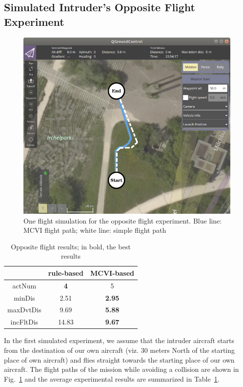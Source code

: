 \documentclass{article}
\begin{document}
\subsection{Simulated Intruder's Opposite Flight Experiment}
\label{ssec:oppositeFlight}

\begin{figure}[t]
    \centering
	\includegraphics[width=0.95\linewidth]{oppositeFlightSimulation.jpg} 
	\caption{One flight simulation for the opposite flight experiment. Blue line: MCVI flight path; white line: simple flight path}
	\label{fig:oppositeFlightSimulation}
\end{figure}

\begin{table}[t]
	\caption{Opposite flight results; in bold, the best results}
	\label{tab:oppositeFlightResults}
	\centering
	\begin{tabular}{c|c|c}
		& rule-based & MCVI-based\\
		\hline 
		actNum & \textbf{4} & 5\\
		minDis & 2.51 & \textbf{2.95} \\
		maxDvtDis & 9.69 & \textbf{5.88} \\
		incFltDis & 14.83 & \textbf{9.67}\\
	\end{tabular}
\end{table}

In the first simulated experiment, we assume that the intruder aircraft starts from the destination of our own aircraft (viz. 30 meters North of the starting place of own aircraft) and flies straight towards the starting place of our own aircraft.
The flight paths of the mission while avoiding a collision are shown in Fig.~\ref{fig:oppositeFlightSimulation} and the average experimental results are summarized in Table~\ref{tab:oppositeFlightResults}.
\end{document}
